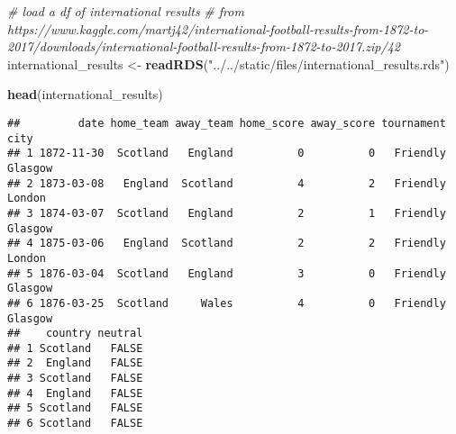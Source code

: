 \documentclass[]{article}
\newenvironment{Shaded}{\begin{snugshade}}{\end{snugshade}}
\newcommand{\CommentTok}[1]{\textcolor[rgb]{0.56,0.35,0.01}{\textit{#1}}}
\newcommand{\KeywordTok}[1]{\textcolor[rgb]{0.13,0.29,0.53}{\textbf{#1}}}
\newcommand{\NormalTok}[1]{#1}
\newcommand{\StringTok}[1]{\textcolor[rgb]{0.31,0.60,0.02}{#1}}
\begin{document}
\begin{Shaded}
\begin{Highlighting}[]
\CommentTok{# load a df of international results}
\CommentTok{# from https://www.kaggle.com/martj42/international-football-results-from-1872-to-2017/downloads/international-football-results-from-1872-to-2017.zip/42}
\NormalTok{international_results <-}\StringTok{ }\KeywordTok{readRDS}\NormalTok{(}\StringTok{"../../static/files/international_results.rds"}\NormalTok{)}

\KeywordTok{head}\NormalTok{(international_results)}
\end{Highlighting}
\end{Shaded}

\begin{verbatim}
##         date home_team away_team home_score away_score tournament    city
## 1 1872-11-30  Scotland   England          0          0   Friendly Glasgow
## 2 1873-03-08   England  Scotland          4          2   Friendly  London
## 3 1874-03-07  Scotland   England          2          1   Friendly Glasgow
## 4 1875-03-06   England  Scotland          2          2   Friendly  London
## 5 1876-03-04  Scotland   England          3          0   Friendly Glasgow
## 6 1876-03-25  Scotland     Wales          4          0   Friendly Glasgow
##    country neutral
## 1 Scotland   FALSE
## 2  England   FALSE
## 3 Scotland   FALSE
## 4  England   FALSE
## 5 Scotland   FALSE
## 6 Scotland   FALSE
\end{verbatim}
\end{document}
